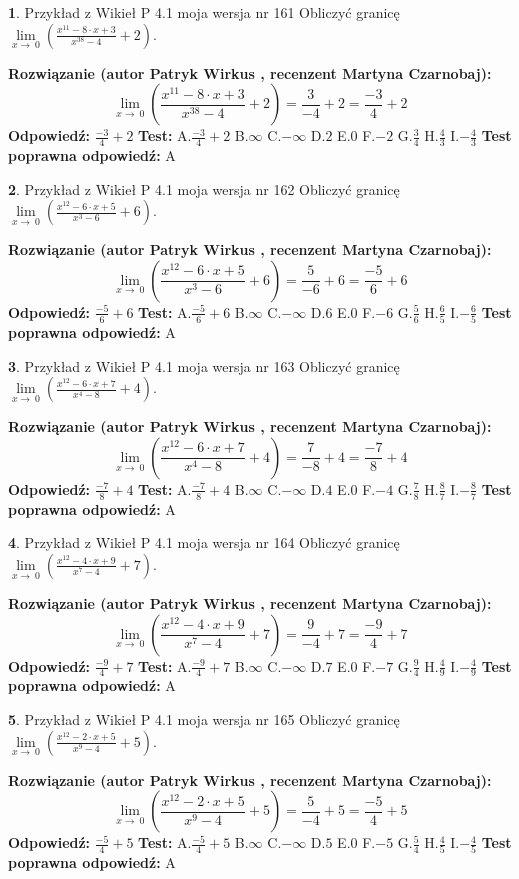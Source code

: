 \documentclass[12pt, a4paper]{article}
\theoremstyle{definition} %
\newtheorem{zad}{}
\newcommand{\zadStart}[1]{\begin{zad}#1\newline}
\newcommand{\zadStop}{\end{zad}}
\newcommand{\rozwStart}[2]{\noindent \textbf{Rozwiązanie (autor #1 , recenzent #2): }\newline}
\newcommand{\rozwStop}{\newline}
\newcommand{\odpStart}{\noindent \textbf{Odpowiedź:}\newline}
\newcommand{\odpStop}{\newline}
\newcommand{\testStart}{\noindent \textbf{Test:}\newline}
\newcommand{\testStop}{\newline}
\newcommand{\kluczStart}{\noindent \textbf{Test poprawna odpowiedź:}\newline}
\newcommand{\kluczStop}{\newline}
\begin{document}
\zadStart{Przykład z Wikieł P 4.1 moja wersja nr 161}
Obliczyć granicę $\lim\limits_{x\to\ 0}(\frac{x^{11}-8 \cdot x +3}{x^{38}-4}+2)$.
\zadStop
\rozwStart{Patryk Wirkus}{Martyna Czarnobaj}
$$\lim\limits_{x\to\ 0}(\frac{x^{11}-8 \cdot x +3}{x^{38}-4}+2)=\frac{3}{-4}+2=\frac{-3}{4}+2$$
\rozwStop
\odpStart
$\frac{-3}{4}+2$
\odpStop
\testStart
A.$\frac{-3}{4}+2$
B.$\infty$
C.$-\infty$
D.$2$
E.$0$
F.$-2$
G.$\frac{3}{4}$
H.$\frac{4}{3}$
I.$-\frac{4}{3}$
\testStop
\kluczStart
A
\kluczStop



\zadStart{Przykład z Wikieł P 4.1 moja wersja nr 162}
Obliczyć granicę $\lim\limits_{x\to\ 0}(\frac{x^{12}-6 \cdot x +5}{x^{3}-6}+6)$.
\zadStop
\rozwStart{Patryk Wirkus}{Martyna Czarnobaj}
$$\lim\limits_{x\to\ 0}(\frac{x^{12}-6 \cdot x +5}{x^{3}-6}+6)=\frac{5}{-6}+6=\frac{-5}{6}+6$$
\rozwStop
\odpStart
$\frac{-5}{6}+6$
\odpStop
\testStart
A.$\frac{-5}{6}+6$
B.$\infty$
C.$-\infty$
D.$6$
E.$0$
F.$-6$
G.$\frac{5}{6}$
H.$\frac{6}{5}$
I.$-\frac{6}{5}$
\testStop
\kluczStart
A
\kluczStop



\zadStart{Przykład z Wikieł P 4.1 moja wersja nr 163}
Obliczyć granicę $\lim\limits_{x\to\ 0}(\frac{x^{12}-6 \cdot x +7}{x^{4}-8}+4)$.
\zadStop
\rozwStart{Patryk Wirkus}{Martyna Czarnobaj}
$$\lim\limits_{x\to\ 0}(\frac{x^{12}-6 \cdot x +7}{x^{4}-8}+4)=\frac{7}{-8}+4=\frac{-7}{8}+4$$
\rozwStop
\odpStart
$\frac{-7}{8}+4$
\odpStop
\testStart
A.$\frac{-7}{8}+4$
B.$\infty$
C.$-\infty$
D.$4$
E.$0$
F.$-4$
G.$\frac{7}{8}$
H.$\frac{8}{7}$
I.$-\frac{8}{7}$
\testStop
\kluczStart
A
\kluczStop



\zadStart{Przykład z Wikieł P 4.1 moja wersja nr 164}
Obliczyć granicę $\lim\limits_{x\to\ 0}(\frac{x^{12}-4 \cdot x +9}{x^{7}-4}+7)$.
\zadStop
\rozwStart{Patryk Wirkus}{Martyna Czarnobaj}
$$\lim\limits_{x\to\ 0}(\frac{x^{12}-4 \cdot x +9}{x^{7}-4}+7)=\frac{9}{-4}+7=\frac{-9}{4}+7$$
\rozwStop
\odpStart
$\frac{-9}{4}+7$
\odpStop
\testStart
A.$\frac{-9}{4}+7$
B.$\infty$
C.$-\infty$
D.$7$
E.$0$
F.$-7$
G.$\frac{9}{4}$
H.$\frac{4}{9}$
I.$-\frac{4}{9}$
\testStop
\kluczStart
A
\kluczStop



\zadStart{Przykład z Wikieł P 4.1 moja wersja nr 165}
Obliczyć granicę $\lim\limits_{x\to\ 0}(\frac{x^{12}-2 \cdot x +5}{x^{9}-4}+5)$.
\zadStop
\rozwStart{Patryk Wirkus}{Martyna Czarnobaj}
$$\lim\limits_{x\to\ 0}(\frac{x^{12}-2 \cdot x +5}{x^{9}-4}+5)=\frac{5}{-4}+5=\frac{-5}{4}+5$$
\rozwStop
\odpStart
$\frac{-5}{4}+5$
\odpStop
\testStart
A.$\frac{-5}{4}+5$
B.$\infty$
C.$-\infty$
D.$5$
E.$0$
F.$-5$
G.$\frac{5}{4}$
H.$\frac{4}{5}$
I.$-\frac{4}{5}$
\testStop
\kluczStart
A
\kluczStop
\end{document}
